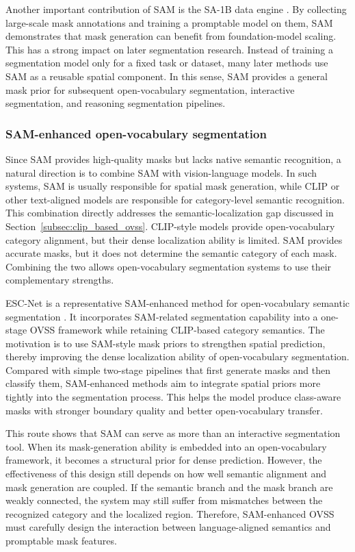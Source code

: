 Another important contribution of SAM is the SA-1B data engine \cite{Kirillov2023}. 
By collecting large-scale mask annotations and training a promptable model on them, SAM demonstrates that mask generation can benefit from foundation-model scaling. 
This has a strong impact on later segmentation research. 
Instead of training a segmentation model only for a fixed task or dataset, many later methods use SAM as a reusable spatial component. 
In this sense, SAM provides a general mask prior for subsequent open-vocabulary segmentation, interactive segmentation, and reasoning segmentation pipelines.

\subsubsection{SAM-enhanced open-vocabulary segmentation}

Since SAM provides high-quality masks but lacks native semantic recognition, a natural direction is to combine SAM with vision-language models. 
In such systems, SAM is usually responsible for spatial mask generation, while CLIP or other text-aligned models are responsible for category-level semantic recognition. 
This combination directly addresses the semantic-localization gap discussed in Section~\ref{subsec:clip_based_ovss}. 
CLIP-style models provide open-vocabulary category alignment, but their dense localization ability is limited. 
SAM provides accurate masks, but it does not determine the semantic category of each mask. 
Combining the two allows open-vocabulary segmentation systems to use their complementary strengths.

ESC-Net is a representative SAM-enhanced method for open-vocabulary semantic segmentation \cite{Lee2025}. 
It incorporates SAM-related segmentation capability into a one-stage OVSS framework while retaining CLIP-based category semantics. 
The motivation is to use SAM-style mask priors to strengthen spatial prediction, thereby improving the dense localization ability of open-vocabulary segmentation. 
Compared with simple two-stage pipelines that first generate masks and then classify them, SAM-enhanced methods aim to integrate spatial priors more tightly into the segmentation process. 
This helps the model produce class-aware masks with stronger boundary quality and better open-vocabulary transfer.

This route shows that SAM can serve as more than an interactive segmentation tool. 
When its mask-generation ability is embedded into an open-vocabulary framework, it becomes a structural prior for dense prediction. 
However, the effectiveness of this design still depends on how well semantic alignment and mask generation are coupled. 
If the semantic branch and the mask branch are weakly connected, the system may still suffer from mismatches between the recognized category and the localized region. 
Therefore, SAM-enhanced OVSS must carefully design the interaction between language-aligned semantics and promptable mask features.

